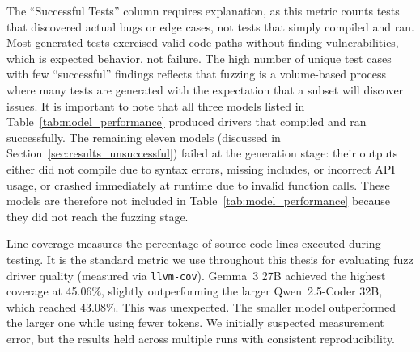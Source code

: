 \begin{table}[htbp]
\centering
\caption{Model Performance Metrics on yaml-cpp Repository}
\label{tab:model_performance}
\end{table}

The ``Successful Tests'' column requires explanation, as this metric counts tests that discovered actual bugs or edge cases, not tests that simply compiled and ran. Most generated tests exercised valid code paths without finding vulnerabilities, which is expected behavior, not failure. The high number of unique test cases with few ``successful'' findings reflects that fuzzing is a volume-based process where many tests are generated with the expectation that a subset will discover issues. It is important to note that all three models listed in Table~\ref{tab:model_performance} produced drivers that compiled and ran successfully. The remaining eleven models (discussed in Section~\ref{sec:results_unsuccessful}) failed at the generation stage: their outputs either did not compile due to syntax errors, missing includes, or incorrect API usage, or crashed immediately at runtime due to invalid function calls. These models are therefore not included in Table~\ref{tab:model_performance} because they did not reach the fuzzing stage.

Line coverage measures the percentage of source code lines executed during testing. It is the standard metric we use throughout this thesis for evaluating fuzz driver quality (measured via \texttt{llvm-cov}). Gemma~3 27B achieved the highest coverage at 45.06\%, slightly outperforming the larger Qwen~2.5-Coder 32B, which reached 43.08\%. This was unexpected. The smaller model outperformed the larger one while using fewer tokens. We initially suspected measurement error, but the results held across multiple runs with consistent reproducibility.

